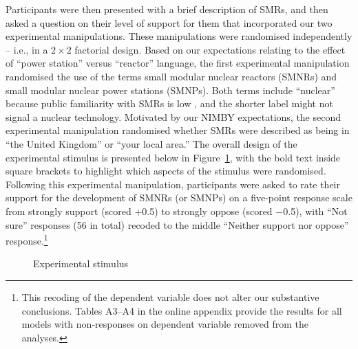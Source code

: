 \documentclass[a4paper, 11pt]{article}
\begin{document}
Participants were then presented with a brief description of SMRs, and then asked a question on their level of support for them that incorporated our two experimental manipulations. These manipulations were randomised independently -- i.e., in a $2 \times 2$ factorial design. Based on our expectations relating to the effect of ``power station'' versus ``reactor'' language, the first experimental manipulation randomised the use of the terms small modular nuclear reactors (SMNRs) and small modular nuclear power stations (SMNPs). Both terms include ``nuclear'' because public familiarity with SMRs is low \citep{durdovic2025,jones2026}, and the shorter label might not signal a nuclear technology. Motivated by our NIMBY expectations, the second experimental manipulation randomised whether SMRs were described as being in ``the United Kingdom'' or ``your local area.'' The overall design of the experimental stimulus is presented below in Figure~\ref{fig:stimulus}, with the bold text inside square brackets to highlight which aspects of the stimulus were randomised. Following this experimental manipulation, participants were asked to rate their support for the development of SMNRs (or SMNPs) on a five-point response scale from strongly support (scored +0.5) to strongly oppose (scored $-$0.5), with ``Not sure'' responses (56 in total) recoded to the middle ``Neither support nor oppose'' response.\footnote{This recoding of the dependent variable does not alter our substantive conclusions. Tables A3--A4 in the online appendix provide the results for all models with non-responses on dependent variable removed from the analyses.}

\begin{figure}[!htbp]
\centering
{}
\caption{Experimental stimulus}
\label{fig:stimulus}
\end{figure}
\end{document}
